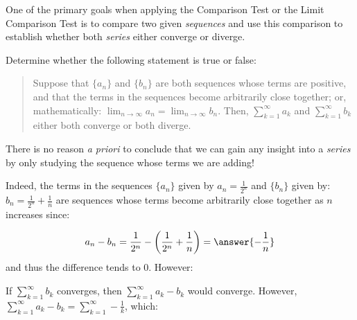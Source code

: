 \documentclass{ximera}
\author{Jim Talamo}
\begin{document}
\begin{exercise}

One of the primary goals when applying the Comparison Test or the Limit Comparison Test is to compare two given \emph{sequences} and use this comparison to establish whether both \emph{series} either converge or diverge.  

Determine whether the following statement is true or false:

\begin{quote}
Suppose that $\{a_n\}$ and $\{b_n\}$ are both sequences whose terms are positive, and that the terms in the sequences become arbitrarily close together; or, mathematically: $\lim_{n \to \infty} a_n = \lim_{n \to \infty} b_n$.  Then, $\sum_{k=1}^{\infty} a_k$ and $\sum_{k=1}^{\infty} b_k$ either both converge or both diverge.
\end{quote}

\begin{multipleChoice}
\end{multipleChoice}

There is no reason \emph{a priori} to conclude that we can gain any insight into a \emph{series} by only studying the sequence whose terms we are adding!  

\begin{exercise}
Indeed, the terms in the sequences $\{a_n\}$ given by $a_n =  \frac{1}{2^n}$ and $\{b_n \}$ given by: $b_n=\frac{1}{2^n} + \frac{1}{n}$ are sequences whose terms become arbitrarily close together as $n$ increases since:

\[
a_n-b_n =  \frac{1}{2^n} - \left(\frac{1}{2^n} + \frac{1}{n}\right) = \answer{-\frac{1}{n}}
\]
and thus the difference tends to $0$.  However:

\begin{multipleChoice}
\end{multipleChoice}

If $\sum_{k=1}^{\infty} b_k$ converges, then $\sum_{k=1}^{\infty} a_k-b_k$ would converge.  However, $\sum_{k=1}^{\infty} a_k-b_k = \sum_{k=1}^{\infty} -\frac{1}{k}$, which: 

\begin{multipleChoice}
\end{multipleChoice}


\end{exercise}
\end{exercise}
\end{document}
